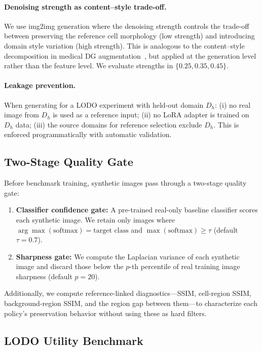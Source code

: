 \documentclass[10pt,twocolumn]{article}
\begin{document}
\paragraph{Denoising strength as content--style trade-off.}
We use img2img generation where the denoising strength controls the
trade-off between preserving the reference cell morphology (low strength)
and introducing domain style variation (high strength). This is analogous
to the content--style decomposition in medical DG
augmentation~\citep{shen2025stylecontentdecompositionbaseddata}, but
applied at the generation level rather than the feature level. We
evaluate strengths in $\{0.25, 0.35, 0.45\}$.

\paragraph{Leakage prevention.}
When generating for a LODO experiment with held-out domain $D_h$:
(i) no real image from $D_h$ is used as a reference input;
(ii) no LoRA adapter is trained on $D_h$ data;
(iii) the source domains for reference selection exclude $D_h$.
This is enforced programmatically with automatic validation.

\subsection{Two-Stage Quality Gate}
\label{sec:quality-gate}

Before benchmark training, synthetic images pass through a two-stage
quality gate:

\begin{enumerate}[leftmargin=*,nosep]
\item \textbf{Classifier confidence gate:} A pre-trained real-only
  baseline classifier scores each synthetic image. We retain only images
  where $\arg\max(\text{softmax}) = \text{target class}$ and
  $\max(\text{softmax}) \geq \tau$ (default $\tau = 0.7$).
\item \textbf{Sharpness gate:} We compute the Laplacian variance of each
  synthetic image and discard those below the $p$-th percentile of real
  training image sharpness (default $p = 20$).
\end{enumerate}

Additionally, we compute reference-linked diagnostics---SSIM,
cell-region SSIM, background-region SSIM, and the region gap between
them---to characterize each policy's preservation behavior without using
these as hard filters.

\subsection{LODO Utility Benchmark}
\label{sec:benchmark}
\end{document}

